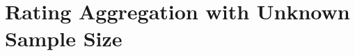 \begin{comment}
\subsection{Try to prove}
\paragraph{Proof Sketch}
We reduce the original problem into other problems step by step.

\begin{proof}
Denote $(f(\vx)-\mu)^2=R(\vx)$, if $R$ is convex, we have

\begin{align*}
\E[(f(\hat{\vx})-\mu)^2]&=\sum_{\vx} \Pr[\vx]R(\vx)\\
&=\sum_{\vx} \Pr[\vx]R(x_1,\vx_{-1})\\
&=\sum_{\vx} \Pr[\vx_{-1}]\sum_{x_1}\Pr{x_1}R(x_1,\vx_{-1})\\
&\le \sum_{\vx} \Pr[\vx_{-1}](\Pr[x_1=0]R(0,\vx_{-1})\\
& +\sum_{x_1\ne 0}\alpha_\mu(f(1,\vx_{-1})-\mu)^2+(1-\alpha_\mu)(f(M,\vx_{-1})-\mu)^2)
\tag{convexity of $f$}
\end{align*}


Thus we can create a new information structure such that $supp(x_1)={0,1,M}$ with higher loss. Due to the symmetries, we can obtain an information structure such that for any $i$, $supp(x_i)={0,1,M}$.

Next, consider $g(1),g(M)$. We use $a,b$ to represent the number of experts reporting $1$ and $M$.

\begin{align*}
    \E[(f(\hat{\vx})-\mu)^2]&=\sum_{a,b} \Pr[a,b]f^2(a,b)+constant\\
\end{align*}



Since $R(a,b)$ is monotone with $a,b$ 


First fix $g(1)$, then $R$ is increasing with $g(M)$

\end{proof}





\end{comment}






\section{Rating Aggregation with Unknown Sample Size}
\label{sec:unknown}

